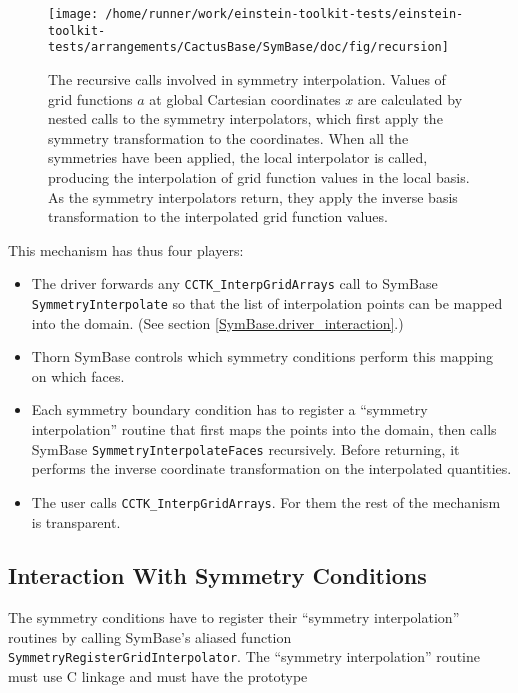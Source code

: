 \begin{figure}[tb]
\begin{center}
\texttt{[image: /home/runner/work/einstein-toolkit-tests/einstein-toolkit-tests/arrangements/CactusBase/SymBase/doc/fig/recursion]}
\end{center}
\caption[Symmetry interpolation] {
	  The recursive calls involved in symmetry interpolation.
	  Values of grid functions $a$ at global Cartesian coordinates $x$ are 
	  calculated by nested calls to the symmetry interpolators, which first
	  apply the symmetry transformation to the coordinates.  When all
	  the symmetries have been applied, the local interpolator is called,
	  producing the interpolation of grid function values in the local basis.
	  As the symmetry interpolators return, they apply the inverse basis
	  transformation to the interpolated grid function values.
}
\label{SymBase.recursion}
\end{figure}

This mechanism has thus four players:
\begin{itemize}
	\item The driver forwards any \texttt{CCTK\_InterpGridArrays} call
	  to SymBase \texttt{SymmetryInterpolate} so that the list of
	  interpolation points can be mapped into the domain. (See section
	  \ref{SymBase.driver_interaction}.)
	\item Thorn SymBase controls which symmetry conditions perform this
	  mapping on which faces.
	\item Each symmetry boundary condition has to register a ``symmetry
	  interpolation'' routine that first maps the points into the domain,
	  then calls SymBase \texttt{SymmetryInterpolateFaces} recursively.
	  Before returning, it performs the inverse coordinate transformation
	  on the interpolated quantities.
	\item The user calls \texttt{CCTK\_InterpGridArrays}.  For them
	  the rest of the mechanism is transparent.
\end{itemize}



\subsection{Interaction With Symmetry Conditions}

The symmetry conditions have to register their ``symmetry
interpolation'' routines by calling SymBase's aliased function
\texttt{SymmetryRegisterGridInterpolator}.  The ``symmetry
interpolation'' routine must use C linkage and must have the prototype

